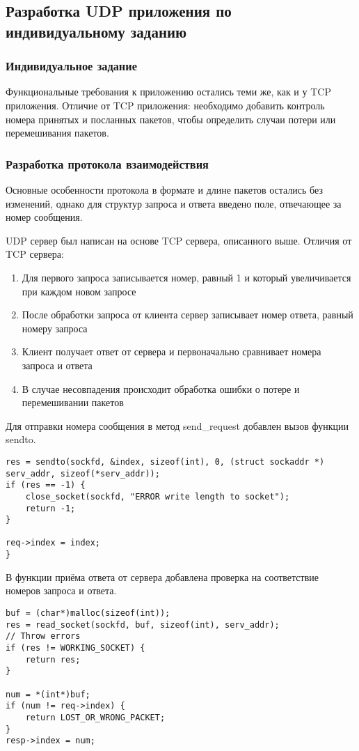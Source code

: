 \subsection{Разработка UDP приложения по индивидуальному заданию}
\subsubsection{Индивидуальное задание}
Функциональные требования к приложению остались теми же, как и у TCP приложения. Отличие от TCP приложения: необходимо добавить контроль номера принятых и посланных пакетов, чтобы определить случаи потери или перемешивания пакетов.
\subsubsection{Разработка протокола взаимодействия}
Основные особенности протокола в формате и длине пакетов остались без изменений, однако для структур запроса и ответа введено поле, отвечающее за номер сообщения.

UDP сервер был написан на основе TCP сервера, описанного выше. Отличия от TCP сервера:
\begin{enumerate}
\item Для первого запроса записывается номер, равный 1 и который увеличивается при каждом новом запросе 
\item После обработки запроса от клиента сервер записывает номер ответа, равный номеру запроса
\item Клиент получает ответ от сервера и первоначально сравнивает номера запроса и ответа
\item В случае несовпадения происходит обработка ошибки о потере и перемешивании пакетов
\end{enumerate}

Для отправки номера сообщения в метод send\_request добавлен вызов функции sendto.
\begin{lstlisting}
res = sendto(sockfd, &index, sizeof(int), 0, (struct sockaddr *) serv_addr, sizeof(*serv_addr));
if (res == -1) {
	close_socket(sockfd, "ERROR write length to socket");
	return -1;
}

req->index = index;
}
\end{lstlisting}

В функции приёма ответа от сервера добавлена проверка на соответствие номеров запроса и ответа.

\begin{lstlisting}
buf = (char*)malloc(sizeof(int));
res = read_socket(sockfd, buf, sizeof(int), serv_addr);
// Throw errors
if (res != WORKING_SOCKET) {
	return res;
}

num = *(int*)buf;
if (num != req->index) {
	return LOST_OR_WRONG_PACKET;
}
resp->index = num;
\end{lstlisting}

